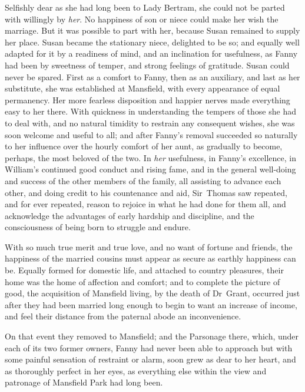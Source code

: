 Selfishly dear as she had long been to Lady Bertram, she could not be parted with willingly by \textit{her}. No happiness of son or niece could make her wish the marriage. But it was possible to part with her, because Susan remained to supply her place. Susan became the stationary niece, delighted to be so; and equally well adapted for it by a readiness of mind, and an inclination for usefulness, as Fanny had been by sweetness of temper, and strong feelings of gratitude. Susan could never be spared. First as a comfort to Fanny, then as an auxiliary, and last as her substitute, she was established at Mansfield, with every appearance of equal permanency. Her more fearless disposition and happier nerves made everything easy to her there. With quickness in understanding the tempers of those she had to deal with, and no natural timidity to restrain any consequent wishes, she was soon welcome and useful to all; and after Fanny's removal succeeded so naturally to her influence over the hourly comfort of her aunt, as gradually to become, perhaps, the most beloved of the two. In \textit{her}  usefulness, in Fanny's excellence, in William's continued good conduct and rising fame, and in the general well-doing and success of the other members of the family, all assisting to advance each other, and doing credit to his countenance and aid, Sir~Thomas saw repeated, and for ever repeated, reason to rejoice in what he had done for them all, and acknowledge the advantages of early hardship and discipline, and the consciousness of being born to struggle and endure.

With so much true merit and true love, and no want of fortune and friends, the happiness of the married cousins must appear as secure as earthly happiness can be. Equally formed for domestic life, and attached to country pleasures, their home was the home of affection and comfort; and to complete the picture of good, the acquisition of Mansfield living, by the death of Dr~Grant, occurred just after they had been married long enough to begin to want an increase of income, and feel their distance from the paternal abode an inconvenience.

On that event they removed to Mansfield; and the Parsonage there, which, under each of its two former owners, Fanny had never been able to approach but with some painful sensation of restraint or alarm, soon grew as dear to her heart, and as thoroughly perfect in her eyes, as everything else within the view and patronage of Mansfield Park had long been.